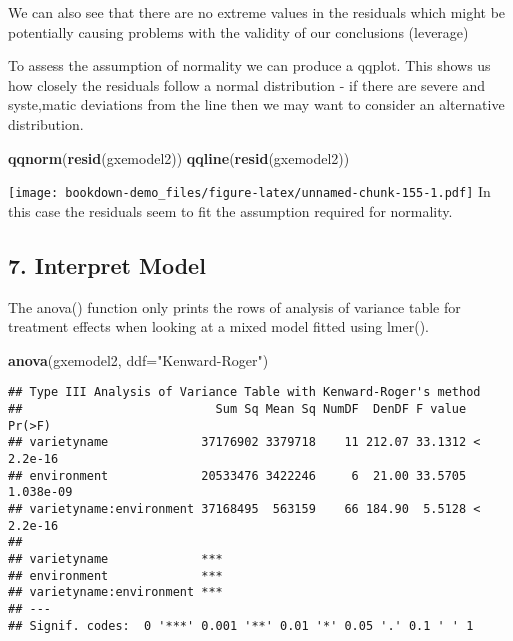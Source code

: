 \documentclass[]{book}
\newenvironment{Shaded}{\begin{snugshade}}{\end{snugshade}}
\newcommand{\KeywordTok}[1]{\textcolor[rgb]{0.13,0.29,0.53}{\textbf{#1}}}
\newcommand{\DataTypeTok}[1]{\textcolor[rgb]{0.13,0.29,0.53}{#1}}
\newcommand{\StringTok}[1]{\textcolor[rgb]{0.31,0.60,0.02}{#1}}
\newcommand{\NormalTok}[1]{#1}
\theoremstyle{definition}
\theoremstyle{definition}
\theoremstyle{definition}
\theoremstyle{remark}
\begin{document}
We can also see that there are no extreme values in the residuals which
might be potentially causing problems with the validity of our
conclusions (leverage)

To assess the assumption of normality we can produce a qqplot. This
shows us how closely the residuals follow a normal distribution - if
there are severe and syste,matic deviations from the line then we may
want to consider an alternative distribution.

\begin{Shaded}
\begin{Highlighting}[]
\KeywordTok{qqnorm}\NormalTok{(}\KeywordTok{resid}\NormalTok{(gxemodel2))}
\KeywordTok{qqline}\NormalTok{(}\KeywordTok{resid}\NormalTok{(gxemodel2))}
\end{Highlighting}
\end{Shaded}

\texttt{[image: bookdown-demo\_files/figure-latex/unnamed-chunk-155-1.pdf]}
In this case the residuals seem to fit the assumption required for
normality.

\subsection{7. Interpret Model}\label{interpret-model-4}

The anova() function only prints the rows of analysis of variance table
for treatment effects when looking at a mixed model fitted using lmer().

\begin{Shaded}
\begin{Highlighting}[]
\KeywordTok{anova}\NormalTok{(gxemodel2, }\DataTypeTok{ddf=}\StringTok{"Kenward-Roger"}\NormalTok{)}
\end{Highlighting}
\end{Shaded}

\begin{verbatim}
## Type III Analysis of Variance Table with Kenward-Roger's method
##                           Sum Sq Mean Sq NumDF  DenDF F value    Pr(>F)
## varietyname             37176902 3379718    11 212.07 33.1312 < 2.2e-16
## environment             20533476 3422246     6  21.00 33.5705 1.038e-09
## varietyname:environment 37168495  563159    66 184.90  5.5128 < 2.2e-16
##                            
## varietyname             ***
## environment             ***
## varietyname:environment ***
## ---
## Signif. codes:  0 '***' 0.001 '**' 0.01 '*' 0.05 '.' 0.1 ' ' 1
\end{verbatim}
\end{document}
